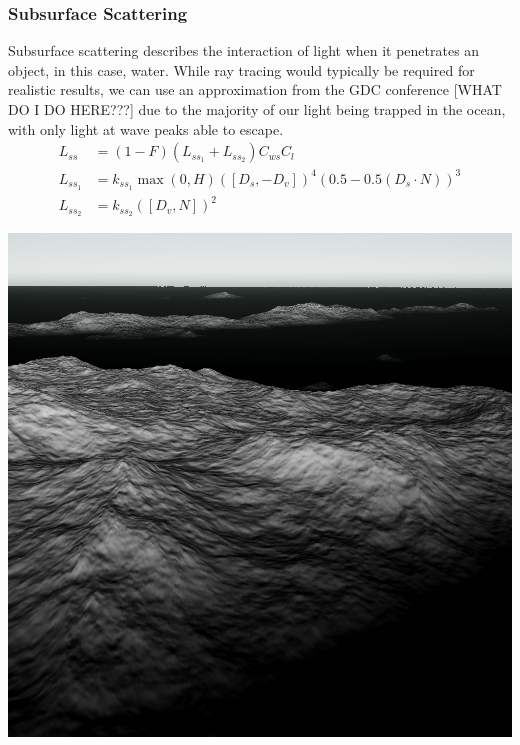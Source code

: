 \subsubsection{Subsurface Scattering}

Subsurface scattering describes the interaction of light when it penetrates an object, in this case, water. While ray tracing would typically be required for realistic results, we can use an approximation from the GDC conference [WHAT DO I DO HERE???] \cite{mark2021} due to the majority of our light being trapped in the ocean, with only light at wave peaks able to escape. 
\begin{equation}
    \begin{split}
        L_{ss} &= (1-F) (L_{ss_1} + L_{ss_2}) C_{ws} C_l\\
        L_{ss_1} &= k_{ss_1} \max(0, H) ([D_s, -D_v])^{4}(0.5-0.5(D_s \cdot N))^{3}\\
        L_{ss_2} &= k_{ss_2} ([D_{v}, N])^{2}
    \end{split}
\end{equation}
\begin{minipage}[t]{0.32\textwidth}
    \includegraphics[width=1\textwidth]{"images/ss1_light.png"}
    \label{fig:lss1_light}
\end{minipage}
\hfill
